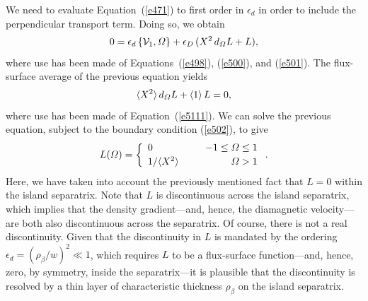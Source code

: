 \documentclass[notitlepage,12pt]{article}
\begin{document}
We need to evaluate Equation~(\ref{e471}) to first order in $\epsilon_d$ in order to include the perpendicular transport term. Doing so,
we obtain
\begin{equation}
0= \epsilon_d\,\{{\cal V}_1, {\mit\Omega}\} + \epsilon_D\,(X^2\,d_{\mit\Omega} L + L),
\end{equation}
where use has been made of Equations~(\ref{e498}), (\ref{e500}),  and (\ref{e501}). The flux-surface average of the
previous equation yields
\begin{equation}
\langle X^2\rangle\,d_{\mit\Omega} L +\langle 1\rangle\,L = 0,
\end{equation}
where use has been made of Equation~(\ref{e5111}). 
We can solve the previous equation, subject to the boundary condition (\ref{e502}), to give
\begin{equation}\label{e526}
L({\mit\Omega})=\left\{
\begin{array}{llr}
0&&-1\leq {\mit\Omega}\leq 1\\[0.5ex]
1/\langle X^2\rangle&~~&{\mit\Omega}>1
\end{array}\right..
\end{equation}
Here, we have taken into account the previously mentioned fact that $L=0$ within the island separatrix.
Note that $L$ is discontinuous across the island separatrix, which implies that the density gradient---and, hence,
the diamagnetic velocity---are both also discontinuous across the separatrix. Of course, there is not a real
discontinuity. Given that the discontinuity in $L$ is mandated by the ordering $\epsilon_d=(\rho_\beta/w)^2\ll 1$, which
requires $L$ to be a flux-surface function---and, hence, zero, by symmetry, inside the separatrix---it is plausible that the discontinuity is resolved by a thin layer of characteristic thickness $\rho_\beta$ on the island
separatrix.
\end{document}
